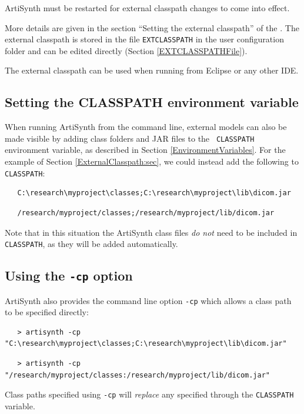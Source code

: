\begin{sideblock}
ArtiSynth must be restarted for external classpath changes to come
into effect.
\end{sideblock}

More details are given in the section ``Setting the external classpath''
of the 
.
The external classpath is stored in the file {\tt EXTCLASSPATH}
in the user configuration folder and can be edited directly
(Section \ref{EXTCLASSPATHFile}).

The external classpath can be used when running from Eclipse or any
other IDE.

\subsection{Setting the CLASSPATH environment variable}
\label{SettingCLASSPATH}

When running ArtiSynth from the command line, external models can also
be made visible by adding class folders and JAR files to the {\tt
CLASSPATH} environment variable, as described in
Section \ref{EnvironmentVariables}. For the example of
Section \ref{ExternalClasspath:sec}, we could instead add the following to
{\tt CLASSPATH}:
\ifWindows
\begin{verbatim}
   C:\research\myproject\classes;C:\research\myproject\lib\dicom.jar
\end{verbatim}
\else
\begin{verbatim}
   /research/myproject/classes;/research/myproject/lib/dicom.jar
\end{verbatim}
\fi
Note that in this situation the ArtiSynth class files {\it do not}
need to be included in {\tt CLASSPATH}, as they will be added
automatically.

\subsection{Using the {\tt -cp} option}

ArtiSynth also provides the command line option {\tt -cp} which allows
a class path to be specified directly:
\ifWindows
\begin{verbatim}
   > artisynth -cp "C:\research\myproject\classes;C:\research\myproject\lib\dicom.jar"
\end{verbatim}
\else
\begin{verbatim}
   > artisynth -cp "/research/myproject/classes:/research/myproject/lib/dicom.jar"
\end{verbatim}
\fi
Class paths specified using {\tt -cp} will {\it replace} any specified
through the {\tt CLASSPATH} variable.

